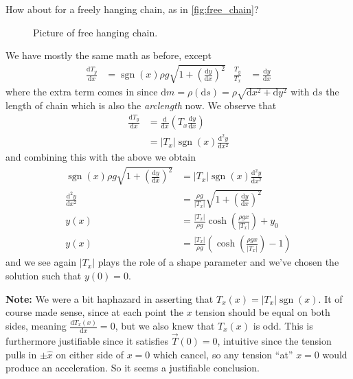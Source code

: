 \documentclass[12pt]{report}
\newcommand*{\rd}[2]{\frac{\mathrm{d}#1}{\mathrm{d}#2}}
\newcommand*{\rtd}[2]{\frac{\mathrm{d}^2#1}{\mathrm{d}#2^2}}
\newcommand*{\abs}[1]{\left|#1\right|}
\DeclareMathOperator{\sgn}{sgn}
\begin{document}
\hrulefill

How about for a freely hanging chain, as in \autoref{fig:free_chain}?
\begin{figure}[!h]
    \centering
    \caption{Picture of free hanging chain.\label{fig:free_chain}}
\end{figure}

We have mostly the same math as before, except
\begin{align*}
    \rd{T_y}{x} &= \sgn(x) \rho g \sqrt{1 + \left( \rd{y}{x} \right)^2} &
    \frac{T_y}{T_x} &= \rd{y}{x}
\end{align*}
where the extra term comes in since $\mathrm{d}m = \rho (\mathrm{d}s) = \rho
\sqrt{\mathrm{d}x^2 + \mathrm{d}y^2}$ with $\mathrm{d}s$ the length of chain
which is also the \emph{arclength} now. We observe that
\begin{align*}
    \rd{T_y}{x} &= \rd{}{x}\left( T_x\rd{y}{x} \right) \\
    &= \abs{T_x}\sgn(x) \rtd{y}{x}
\end{align*}
and combining this with the above we obtain
\begin{align}
    \sgn(x) \rho g \sqrt{1 + \left( \rd{y}{x} \right)^2}
        &= \abs{T_x}\sgn(x)\rtd{y}{x}\nonumber\\
    \rtd{y}{x} &= \frac{\rho g}{\abs{T_x}}
        \sqrt{1 + \left( \rd{y}{x} \right)^2}\nonumber\\
    y(x) &= \frac{\abs{T_x}}{\rho g} \cosh
        \left( \frac{\rho g x}{\abs{T_x}} \right) + y_0\nonumber\\
    y(x) &= \frac{\abs{T_x}}{\rho g} \left(
        \cosh\left( \frac{\rho g x}{\abs{T_x}} \right)
        - 1\right) \label{eq:chain_curve}
\end{align}
and we see again $\abs{T_x}$ plays the role of a shape parameter and we've
chosen the solution such that $y(0) = 0$.

\textbf{Note:} We were a bit haphazard in asserting that $T_x(x) =
\abs{T_x}\sgn(x)$. It of course made sense, since at each point the $x$ tension
should be equal on both sides, meaning $\rd{T_x(x)}{x} = 0$, but we also knew
that $T_x(x)$ is odd. This is furthermore justifiable since it satisfies
$\vec{T}(0) = 0$, intuitive since the tension pulls in $\pm \hat{x}$ on either
side of $x=0$ which cancel, so any tension ``at'' $x = 0$ would produce an
acceleration. So it seems a justifiable conclusion.
\end{document}
